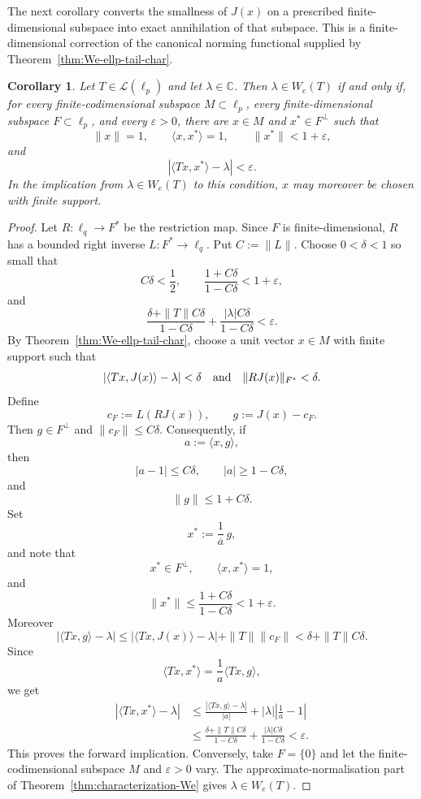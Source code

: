 \documentclass[11pt]{amsart}
\numberwithin{equation}{section}
\newtheorem{corollary}[theorem]{Corollary}
\theoremstyle{definition}
\theoremstyle{remark}
\newcommand{\C}{\mathbb{C}}
\newcommand{\ip}[2]{\langle #1,#2\rangle}
\newcommand{\We}{W_e}
\begin{document}
The next corollary converts the smallness of $J(x)$ on a prescribed finite-dimensional subspace into exact annihilation of that subspace.  This is a finite-dimensional correction of the canonical norming functional supplied by Theorem~\ref{thm:We-ellp-tail-char}.

\begin{corollary}\label{cor:lp-annihilator-We}
Let $T\in\mathcal L(\ell_p)$ and let $\lambda\in\C$. Then
$\lambda\in W_e(T)$ if and only if, for every finite-codimensional subspace
$M\subset \ell_p$, every finite-dimensional subspace $F\subset \ell_p$, and
every $\varepsilon>0$, there are $x\in M$ and $x^*\in F^\perp$ such that
\[
        \|x\|=1,
        \qquad
        \ip{x}{x^*}=1,
        \qquad
        \|x^*\|<1+\varepsilon,
\]
and
\[
        |\ip{Tx}{x^*}-\lambda|<\varepsilon.
\]
In the implication from $\lambda\in W_e(T)$ to this condition, $x$ may moreover
be chosen with finite support.
\end{corollary}

\begin{proof}
Let $R:\ell_q\to F^*$ be the restriction map.  Since $F$ is finite-dimensional, $R$ has a bounded right inverse $L:F^*\to\ell_q$.  Put $C:=\|L\|$.
Choose $0<\delta<1$ so small that
\[
        C\delta<\frac12, \qquad 
        \frac{1+C\delta}{1-C\delta}<1+\varepsilon,
\]
and
\[
        \frac{\delta+\|T\|C\delta}{1-C\delta}
        +\frac{|\lambda|C\delta}{1-C\delta}<\varepsilon .
\]
By Theorem~\ref{thm:We-ellp-tail-char}, choose a unit vector $x\in M$ with finite support such that
\[
        |\ip{Tx}{J(x)}-\lambda|<\delta
        \quad\hbox{and}\quad
        \|RJ(x)\|_{F^*}<\delta .
\]
Define
\[
        c_F:=L(RJ(x)),
        \qquad
        g:=J(x)-c_F .
\]
Then $g\in F^\perp$ and
\(
        \|c_F\|\le C\delta .
\)
Consequently, if
\[
        a:=\ip{x}{g},
\]
then
\[
        |a-1|\le C\delta,
        \qquad
        |a|\ge1-C\delta,
\]
and
\[
        \|g\|\le1+C\delta .
\]
Set
\[
        x^*:=\frac{1}{\overline a}\,g,
\]
and note that 
\[
        x^*\in F^\perp,
        \qquad
        \ip{x}{x^*}=1,
\]
and
\[
        \|x^*\|
        \le\frac{1+C\delta}{1-C\delta}<1+\varepsilon .
\]
Moreover
\[
        |\ip{Tx}{g}-\lambda|
        \le |\ip{Tx}{J(x)}-\lambda|+\|T\|\|c_F\|
        <\delta+\|T\|C\delta .
\]
Since
\[
        \ip{Tx}{x^*}=\frac{1}{a}\ip{Tx}{g},
\]
we get
\[
\begin{aligned}
        |\ip{Tx}{x^*}-\lambda|
        &\le \frac{|\ip{Tx}{g}-\lambda|}{|a|}
        + |\lambda|\left|\frac1a-1\right|  \\
        &\le
        \frac{\delta+\|T\|C\delta}{1-C\delta}
        +\frac{|\lambda|C\delta}{1-C\delta}
        <\varepsilon .
\end{aligned}
\]
This proves the forward implication. Conversely, take $F=\{0\}$ and let the
finite-codimensional subspace $M$ and $\varepsilon>0$ vary. The
approximate-normalisation part of Theorem~\ref{thm:characterization-We} gives
$\lambda\in\We(T)$.
\end{proof}
\end{document}
